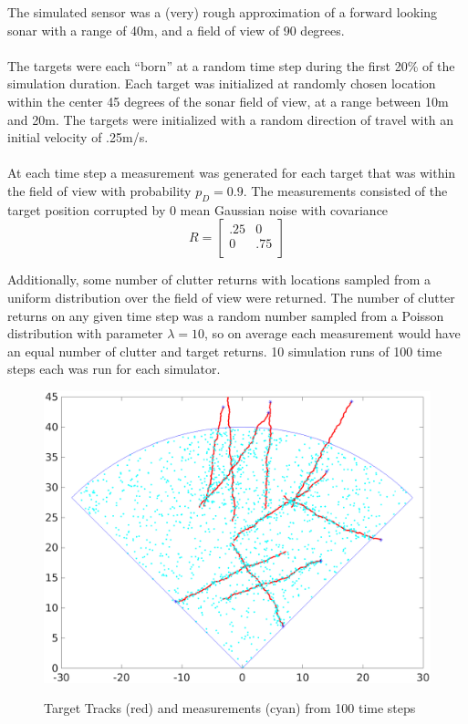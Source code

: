 \documentclass{article}
\begin{document}
The simulated sensor was a (very) rough approximation of a forward looking sonar with a range of 40m, and a field of view of 90 degrees.\\
\\
The targets were each ``born'' at a random time step during the first 20\% of the simulation duration. Each target was initialized at randomly chosen location within the center 45 degrees of the sonar field of view, at a range between 10m and 20m. The targets were initialized with a random direction of travel with an initial velocity of .25m/s.\\
\\
At each time step a measurement was generated for each target that was within the field of view with probability $p_D = 0.9$. The measurements consisted of the target position corrupted by 0 mean Gaussian noise with covariance
\begin{equation}
  \label{eq:R_true}
  R =
  \begin{bmatrix}
    .25 & 0\\
    0 & .75 \\
  \end{bmatrix}
\end{equation}

Additionally, some number of clutter returns with locations sampled from a uniform distribution over the field of view were returned. The number of clutter returns on any given time step was a random number sampled from a Poisson distribution with parameter $\lambda = 10$, so on average each measurement would have an equal number of clutter and target returns. 10 simulation runs of 100 time steps each was run for each simulator.\\

\begin{figure}[H]
  \centering
  \includegraphics[width=.75\linewidth]{track_obs.png}
  \label{fig:track_obs}
  \caption{Target Tracks (red) and measurements (cyan) from 100 time steps}
\end{figure}
\end{document}
